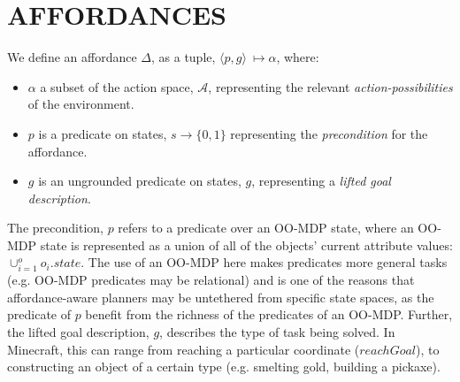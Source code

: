 \documentclass[]{article}
\begin{document}



\section{AFFORDANCES}
\label{sec:affordances}

We define an affordance $\Delta$, 
as a tuple, $\langle p,g\rangle\ \longmapsto \alpha$,
where:
\begin{itemize}
\item[] $\alpha$ a subset of the action space, $\mathcal{A}$, representing the relevant {\it action-possibilities} of the environment.
\item[] $p$ is a predicate on states, $s \longrightarrow \{$0$, 1\}$
  representing the {\em precondition} for the affordance.
\item[] $g$ is an ungrounded predicate on states, $g$, representing a {\it lifted goal description}.
\end{itemize}
The precondition, $p$ refers to a predicate over an OO-MDP state,
where an OO-MDP state is represented as a union of all of the objects'
current attribute values: $\cup_{i = 1}^o o_i.state$.  The use of an
OO-MDP here makes predicates more general tasks (e.g. OO-MDP
predicates may be relational) and is one of the reasons that
affordance-aware planners may be untethered from specific state
spaces, as the predicate of $p$ benefit from the richness of the
predicates of an OO-MDP. Further, the lifted goal description, $g$, describes
the type of task being solved. In
Minecraft, this can range from reaching a particular coordinate
($reachGoal$), to constructing an object of a certain type
(e.g. smelting gold, building a pickaxe).
\end{document}
